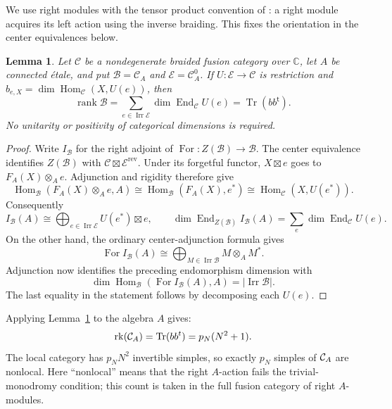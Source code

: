 \documentclass[11pt,a4paper]{article}
\numberwithin{equation}{section}
\newtheorem{lemma}[theorem]{Lemma}
\theoremstyle{definition}\newtheorem{definition}[theorem]{Definition}
\theoremstyle{remark}\newtheorem{remark}[theorem]{Remark}
\newcommand{\parityrank}{p_N}
\begin{document}
We use right modules with the tensor product convention of
\cite[Section 3.3]{dmno}: a right module acquires its left action
using the inverse braiding. This fixes the orientation in the center
equivalences below.

\begin{lemma}\label{audit:ranklemma}
Let $\mathcal C$ be a nondegenerate braided fusion category over
$\mathbb C$, let $A$ be connected \'etale, and put
$\mathcal B=\mathcal C_A$ and $\mathcal E=\mathcal C_A^0$.
If $U:\mathcal E\to\mathcal C$ is restriction and
$b_{e,X}=\dim\operatorname{Hom}_{\mathcal C}(X,U(e))$, then
\[
 \operatorname{rank}\mathcal B
 =\sum_{e\in\operatorname{Irr}\mathcal E}
       \dim\operatorname{End}_{\mathcal C}U(e)
 =\operatorname{Tr}(bb^{\mathsf t}).
\]
No unitarity or positivity of categorical dimensions is required.
\end{lemma}
\begin{proof}
Write $I_{\mathcal B}$ for the right adjoint of
$\operatorname{For}:Z(\mathcal B)\to\mathcal B$.
The center equivalence
\cite[Corollary 3.30 and Remark 3.31(i)]{dmno}
identifies $Z(\mathcal B)$ with
$\mathcal C\boxtimes\mathcal E^{\mathrm{rev}}$.
Under its forgetful functor, $X\boxtimes e$ goes to
$F_A(X)\otimes_A e$.
Adjunction and rigidity therefore give
\[
 \operatorname{Hom}_{\mathcal B}(F_A(X)\otimes_A e,A)
 \cong\operatorname{Hom}_{\mathcal B}(F_A(X),e^*)
 \cong\operatorname{Hom}_{\mathcal C}(X,U(e^*)).
\]
Consequently
\[
 I_{\mathcal B}(A)
 \cong\bigoplus_{e\in\operatorname{Irr}\mathcal E}U(e^*)\boxtimes e,
 \qquad
 \dim\operatorname{End}_{Z(\mathcal B)}I_{\mathcal B}(A)
 =\sum_e\dim\operatorname{End}_{\mathcal C}U(e).
\]
On the other hand, the ordinary center-adjunction formula
\cite[Proposition 9.2.2]{egno} gives
\[
 \operatorname{For}I_{\mathcal B}(A)
 \cong\bigoplus_{M\in\operatorname{Irr}\mathcal B}M\otimes_A M^*.
\]
Adjunction now identifies the preceding endomorphism dimension with
\[
 \dim\operatorname{Hom}_{\mathcal B}
 (\operatorname{For}I_{\mathcal B}(A),A)
 =|\operatorname{Irr}\mathcal B|.
\]
The last equality in the statement follows by decomposing each $U(e)$.
\end{proof}


Applying Lemma~\ref{audit:ranklemma} to the algebra $A$ gives:
\begin{equation}\label{r:eq:rankfull}
  \operatorname{rk}(\Cat_A)=\operatorname{Tr}(bb^t)=\parityrank(N^2+1).
\end{equation}
The local category has $\parityrank N^2$ invertible simples, so
exactly $\parityrank$ simples of $\mathcal C_A$ are nonlocal. Here
``nonlocal'' means that the right $A$-action fails the trivial-monodromy
condition; this count is taken in the full fusion category of
right $A$-modules.
\end{document}
